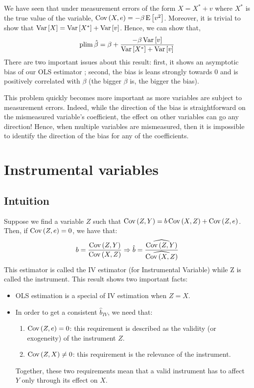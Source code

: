We have seen that under measurement errors of the form $X = X^* + v$ where $X^*$ is the true value of the variable, $\operatorname{Cov}\left(X,e\right) = -\beta\operatorname{E}\left[v^2\right]$. Moreover, it is trivial to show that $\operatorname{Var}\left[X\right] = \operatorname{Var}\left[X^*\right] + \operatorname{Var}\left[v\right]$. Hence, we can show that, $$\operatorname{plim}\hat\beta = \beta + \frac{-\beta\operatorname{Var}\left[v\right]}{\operatorname{Var}\left[X^*\right]+\operatorname{Var}\left[v\right]} $$ There are two important issues about this result: first, it shows an asymptotic bias of our OLS estimator ; second, the bias is leans strongly towards 0 and is positively correlated with $\beta$ (the bigger $\beta$ is, the bigger the bias).

This problem quickly becomes more important as more variables are subject to measurement errors. Indeed, while the direction of the bias is straightforward on the mismeasured variable's coefficient, the effect on other variables can go any direction! Hence, when multiple variables are mismeasured, then it is impossible to identify the direction of the bias for any of the coefficients.

\section{Instrumental variables}

\subsection{Intuition}

Suppose we find a variable $Z$ such that $\operatorname{Cov}\left(Z,Y\right) = b\operatorname{Cov}\left(X,Z\right) + \operatorname{Cov}\left(Z,e\right)$. Then, if $\operatorname{Cov}\left(Z,e\right)=0$, we have that: $$b = \frac{\operatorname{Cov}\left(Z,Y\right)}{\operatorname{Cov}\left(X,Z\right)} \Rightarrow \hat b = \frac{\widehat{\operatorname{Cov}\left(Z,Y\right)}}{\widehat{\operatorname{Cov}\left(X,Z\right)}} $$ This estimator is called the IV estimator (for Instrumental Variable) while Z is called the instrument. This result shows two important facts:\begin{itemize}
\item OLS estimation is a special of IV estimation when $Z = X$.
\item In order to get a consistent $\hat b_{IV}$, we need that:\begin{enumerate}
\item $\operatorname{Cov}\left(Z,e\right) = 0$: this requirement is described as the validity (or exogeneity) of the instrument $Z$.
\item $\operatorname{Cov}\left(Z,X\right) \neq 0$: this requirement is the relevance of the instrument.
\end{enumerate}
Together, these two requirements mean that a valid instrument has to affect $Y$ only through its effect on $X$.
\end{itemize}

